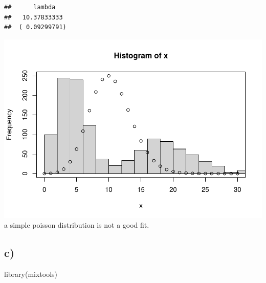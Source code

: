 \documentclass[
]{article}
\newenvironment{Shaded}{\begin{snugshade}}{\end{snugshade}}
\newcommand{\AttributeTok}[1]{\textcolor[rgb]{0.77,0.63,0.00}{#1}}
\newcommand{\ConstantTok}[1]{\textcolor[rgb]{0.00,0.00,0.00}{#1}}
\newcommand{\DecValTok}[1]{\textcolor[rgb]{0.00,0.00,0.81}{#1}}
\newcommand{\FunctionTok}[1]{\textcolor[rgb]{0.00,0.00,0.00}{#1}}
\newcommand{\NormalTok}[1]{#1}
\newcommand{\OtherTok}[1]{\textcolor[rgb]{0.56,0.35,0.01}{#1}}
\newcommand{\SpecialCharTok}[1]{\textcolor[rgb]{0.00,0.00,0.00}{#1}}
\newcommand{\StringTok}[1]{\textcolor[rgb]{0.31,0.60,0.02}{#1}}
\begin{document}
\begin{verbatim}
##      lambda   
##   10.37833333 
##  ( 0.09299791)
\end{verbatim}

\begin{Shaded}
\end{Shaded}

\includegraphics{539-hw3_files/figure-latex/unnamed-chunk-15-1.pdf} a
simple poisson distribution is not a good fit.

\hypertarget{c-2}{%
\subsection{c)}\label{c-2}}

\begin{Shaded}
\begin{Highlighting}[]
\FunctionTok{library}\NormalTok{(mixtools)}
\end{Highlighting}
\end{Shaded}
\end{document}
